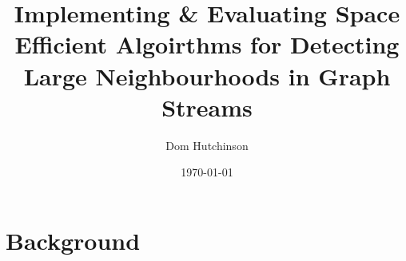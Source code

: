 \documentclass[11pt,twoside,a4paper]{report}
\begin{document}
\renewcommand{\headrulewidth}{0pt}
\newcommand{\ie}{\textit{i.e.} }
\newcommand{\nats}{\mathbb{N} }
\newcommand{\horizontalline}{\newline\vspace{.3cm}\hfill\makebox[.5\linewidth]{\rule{.5\textwidth}{0.4pt}}\hfill\vspace{.1cm}}
\title{Implementing \& Evaluating Space Efficient Algoirthms for Detecting Large Neighbourhoods in Graph Streams}
\author{Dom Hutchinson}
\date{\today}
\maketitle

\pagestyle{fancy}
\fancyhead[C]{}
\fancyhead[R]{\today}

\chapter{Background}
\end{document}
